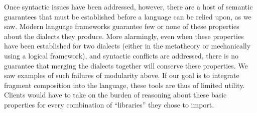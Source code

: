 \documentclass[9pt,preprint]{sigplanconf}
\begin{document}
Once syntactic issues have been addressed, however, there are a host of semantic guarantees  that must be established before a language can be relied upon, as we saw. %
Modern language frameworks guarantee few or none of these properties about the dialects they produce. More alarmingly, even when these properties have been established for two dialects  (either in the metatheory or mechanically using a logical framework), and syntactic conflicts are addressed, there is no guarantee that merging the dialects together will conserve these properties. We saw examples of such failures of modularity above. If our goal is to integrate fragment composition into the language, these tools are thus of limited utility. Clients would have to take on the burden of reasoning about these basic properties for every combination of ``libraries'' they chose to import.%
\end{document}

